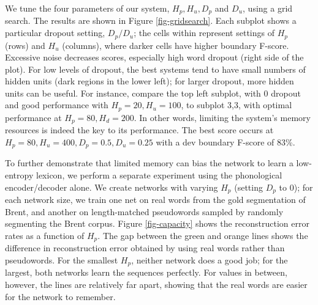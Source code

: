 \documentclass[11pt,letterpaper]{article}
\begin{document}

We tune the four parameters of our system, $H_p, H_u, D_p$ and $D_u$,
using a grid search. The results are shown in Figure
\ref{fig-gridsearch}. Each subplot shows a particular dropout setting,
$D_p/D_u$; the cells within represent settings of $H_p$ (rows) and
$H_u$ (columns), where darker cells have higher boundary
F-score. Excessive noise decreases scores, especially high word
dropout (right side of the plot). For low levels of dropout, the best
systems tend to have small numbers of hidden units (dark regions in
the lower left); for larger dropout, more hidden units can be
useful. For instance, compare the top left subplot, with 0 dropout and
good performance with $H_p=20, H_u=100$, to subplot 3,3, with optimal
performance at $H_p=80, H_d=200$. In other words, limiting the
system's memory resources is indeed the key to its performance. The
best score occurs at $H_p=80, H_u=400, D_p=0.5, D_u=0.25$ with a dev
boundary F-score of 83\%.

To further demonstrate that limited memory can bias the network to
learn a low-entropy lexicon, we perform a separate experiment using
the phonological encoder/decoder alone. We create networks with
varying $H_p$ (setting $D_p$ to 0); for each network size, we train
one net on real words from the gold segmentation of Brent, and another
on length-matched pseudowords sampled by randomly segmenting the Brent
corpus. Figure \ref{fig-capacity} shows the reconstruction error rates
as a function of $H_p$. The gap between the green and orange lines
shows the difference in reconstruction error obtained by using real
words rather than pseudowords. For the smallest $H_p$, neither network
does a good job; for the largest, both networks learn the sequences
perfectly. For values in between, however, the lines are relatively
far apart, showing that the real words are easier for the network to
remember.
\end{document}
